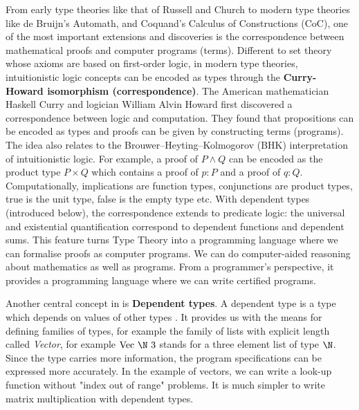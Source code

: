 From early type theories like that of Russell and Church to modern type theories like de Bruijn's Automath, \mltt and Coquand's Calculus of Constructions (CoC), one of the most important extensions and discoveries is the correspondence between mathematical proofs and computer programs (terms).
Different to set theory whose axioms are based on first-order logic, in modern type theories, intuitionistic logic concepts can be encoded as types through the 
\textbf{Curry-Howard isomorphism (correspondence)}.
The American mathematician Haskell Curry and logician William Alvin
Howard first discovered a correspondence between logic and
computation. They found that propositions can be encoded as types and
proofs can be given by constructing terms (programs). The idea also
relates to the Brouwer–Heyting–Kolmogorov (BHK) interpretation of
intuitionistic logic. For example, a proof of $P \wedge Q$ can be
encoded as the product type $P \times Q$ which contains a proof of $p
: P$ and a proof of $q : Q$. Computationally, implications are
function types, conjunctions are product types, true is the unit type,
false is the empty type etc. 
With dependent types (introduced below), the correspondence extends to predicate logic: the universal and existential quantification correspond to dependent functions and dependent sums. 
This feature turns Type Theory into a programming language where we can formalise proofs as computer programs. We can do computer-aided reasoning about mathematics as well as programs. From a programmer's perspective, it provides a programming language where we can write certified programs.


Another central concept in \mltt is \textbf{Dependent types}.
A dependent type is a type which depends on values of other types \cite{dtw}. It provides us with the means for defining families of types, for example the family of lists with explicit length called \emph{Vector}, for example $\text{Vec} ~\N ~3$ stands for a three element list of type $\N$. Since the type carries more information, the program specifications can be expressed more accurately. In the example of vectors, we can write a look-up function without "index out of range" problems. It is much simpler to write matrix multiplication with dependent types.


